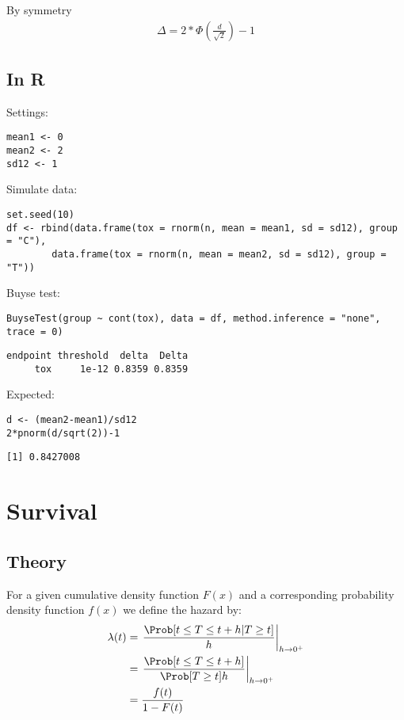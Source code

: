 \documentclass{article}
\begin{document}
By symmetry
\begin{align*}
\Delta = 2*\Phi(\frac{d}{\sqrt{2}})-1
\end{align*}

\subsection{In R}
\label{sec:org259d92b}

Settings:
\lstset{language=r,label= ,caption= ,captionpos=b,numbers=none}
\begin{lstlisting}
mean1 <- 0
mean2 <- 2
sd12 <- 1
\end{lstlisting}

Simulate data:
\lstset{language=r,label= ,caption= ,captionpos=b,numbers=none}
\begin{lstlisting}
set.seed(10)
df <- rbind(data.frame(tox = rnorm(n, mean = mean1, sd = sd12), group = "C"),
	    data.frame(tox = rnorm(n, mean = mean2, sd = sd12), group = "T"))
\end{lstlisting}

Buyse test:
\lstset{language=r,label= ,caption= ,captionpos=b,numbers=none}
\begin{lstlisting}
BuyseTest(group ~ cont(tox), data = df, method.inference = "none", trace = 0)
\end{lstlisting}

\begin{verbatim}
endpoint threshold  delta  Delta
     tox     1e-12 0.8359 0.8359
\end{verbatim}

Expected:
\lstset{language=r,label= ,caption= ,captionpos=b,numbers=none}
\begin{lstlisting}
d <- (mean2-mean1)/sd12
2*pnorm(d/sqrt(2))-1
\end{lstlisting}

\begin{verbatim}
[1] 0.8427008
\end{verbatim}

\clearpage

\section{Survival}
\label{sec:org5ee3ff8}

\subsection{Theory}
\label{sec:org1c2a052}
For a given cumulative density function \(F(x)\) and a corresponding
probability density function \(f(x)\) we define the hazard by:
\begin{align*}
\lambda(t) &=  \left. \frac{\Prob[t\leq T \leq t+h|T\geq t]}{h}\right|_{h \rightarrow 0^+} \\
&= \left. \frac{\Prob[t\leq T \leq t+h]}{\Prob[T\geq t]h}\right|_{h \rightarrow 0^+} \\
&= \frac{f(t)}{1-F(t)}
\end{align*}
\end{document}
